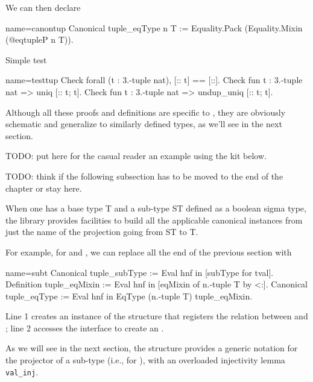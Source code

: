 We can then declare

\begin{coq}{name=canontup}{}
Canonical tuple_eqType n T :=
  Equality.Pack (Equality.Mixin (@eqtupleP n T)).
\end{coq}

Simple test

\begin{coq}{name=testtup}{}
Check forall (t : 3.-tuple nat), [:: t] == [::].
Check fun t : 3.-tuple nat => uniq [:: t; t].
Check fun t : 3.-tuple nat => undup_uniq [:: t; t].
\end{coq}

Although all these proofs and definitions are specific to ,
they are obviously schematic and generalize to similarly defined types,
as we'll see in the next section.

TODO: put here for the casual reader an example using the kit below.

TODO: think if the following subsection has to be moved to the end
of the chapter or stay here.

\mcbREQUIRE{}

When one has a base type T and a sub-type ST defined as a boolean
sigma type, the \mcbMC{} library provides facilities to
build all the applicable canonical instances from just
the name of the projection going from ST to T.

For example, for  and , we can replace all the end of the
previous section with

\begin{coq}{name=subt}{}
Canonical tuple_subType := Eval hnf in [subType for tval].
Definition tuple_eqMixin := Eval hnf in [eqMixin of n.-tuple T by <:].
Canonical tuple_eqType := Eval hnf in EqType (n.-tuple T) tuple_eqMixin.
\end{coq}

Line 1 creates an instance of the  structure that registers the
relation between  and ; line 2 accesses the 
interface to create an .

As we will see in the next section, the  structure provides
a generic notation  for the projector of a sub-type (i.e.,
 for ),
with an overloaded injectivity lemma \lstinline/val_inj/.


